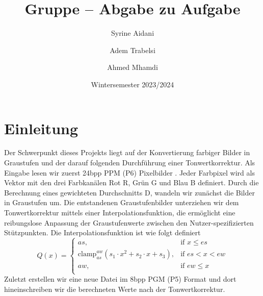 \documentclass[course=erap]{aspdoc}
\author{Syrine Aidani \and Adem Trabelsi \and Ahmed Mhamdi}
\date{Wintersemester 2023/2024}
\title{Gruppe \theGroup{} -- Abgabe zu Aufgabe \theNumber}
\newcommand{\clamp}[3]{\text{clamp}^{#1} _{#2} (#3)}
\begin{document}
\maketitle


\section{Einleitung}
Der Schwerpunkt dieses Projekts liegt auf der Konvertierung farbiger Bilder in Graustufen und der darauf folgenden Durchführung einer Tonwertkorrektur. Als Eingabe lesen wir zuerst 24bpp PPM (P6) Pixelbilder \cite{netpbm}. Jeder Farbpixel wird als Vektor mit den drei Farbkanälen Rot R, Grün G und Blau B definiert. Durch die Berechnung eines gewichteten Durchschnitts D, wandeln wir zunächst die Bilder in Graustufen um. Die entstandenen Graustufenbilder unterziehen wir dem Tonwertkorrektur mittels einer Interpolationsfunktion, die ermöglicht eine reibungslose Anpassung der Graustufenwerte zwischen den Nutzer-spezifizierten Stützpunkten. Die Interpolationsfunktion ist wie folgt definiert
\[
Q(x) =
\begin{cases}
  as, & \text{if } x \leq es \\
  \clamp{aw}{as}{s_1 \cdot x^2 + s_2 \cdot x + s_3 }, & \text{if } es < x < ew\\
  aw, & \text{if } ew \leq x \\
\end{cases}
\]
Zuletzt erstellen wir eine neue Datei im 8bpp PGM (P5) Format \cite{netpbm} und dort hineinschreiben wir die berechneten Werte nach der Tonwertkorrektur.
\end{document}
